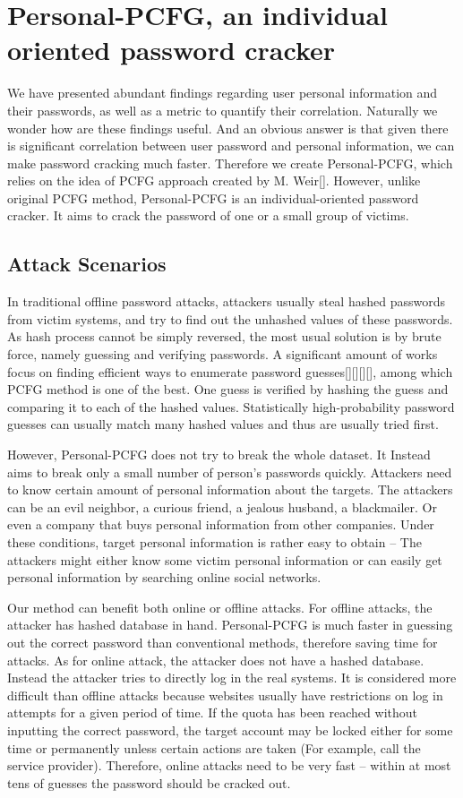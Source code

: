 \documentclass{sig-alternate}
\begin{document}
\section{Personal-PCFG, an individual oriented password cracker}
We have presented abundant findings regarding user personal information and their passwords, as well as a metric to quantify their correlation. Naturally we wonder how are these findings useful. And an obvious answer is that given there is significant correlation between user password and personal information, we can make password cracking much faster. Therefore we create Personal-PCFG, which relies on the idea of PCFG approach created by M. Weir[]. However, unlike original PCFG method, Personal-PCFG is an individual-oriented password cracker. It aims to crack the password of one or a small group of victims.

\subsection{Attack Scenarios}
In traditional offline password attacks, attackers usually steal hashed passwords from victim systems, and try to find out the unhashed values of these passwords. As hash process cannot be simply reversed, the most usual solution is by brute force, namely guessing and verifying passwords. A significant amount of works focus on finding efficient ways to enumerate password guesses[][][][], among which PCFG method is one of the best. One guess is verified by hashing the guess and comparing it to each of the hashed values. Statistically high-probability password guesses can usually match many hashed values and thus are usually tried first.

However, Personal-PCFG does not try to break the whole dataset. It Instead aims to break only a small number of person's passwords quickly. Attackers need to know certain amount of personal information about the targets. The attackers can be an evil neighbor, a curious friend, a jealous husband, a blackmailer. Or even a company that buys personal information from other companies. Under these conditions, target personal information is rather easy to obtain -- The attackers might either know some victim personal information or can easily get personal information by searching online social networks. 

Our method can benefit both online or offline attacks. For offline attacks, the attacker has hashed database in hand. Personal-PCFG is much faster in guessing out the correct password than conventional methods, therefore saving time for attacks. As for online attack, the attacker does not have a hashed database. Instead the attacker tries to directly log in the real systems. It is considered more difficult than offline attacks because websites usually have restrictions on log in attempts for a given period of time. If the quota has been reached without inputting the correct password, the target account may be locked either for some time or permanently unless certain actions are taken (For example, call the service provider). Therefore, online attacks need to be very fast -- within at most tens of guesses the password should be cracked out.
\end{document}
